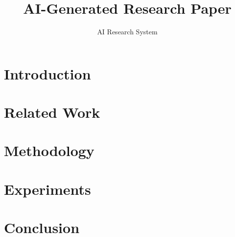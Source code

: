 \documentclass{article}
\title{AI-Generated Research Paper}
\author{AI Research System}
\begin{document}
\maketitle

\begin{abstract}

\end{abstract}

\section{Introduction}


\section{Related Work}


\section{Methodology}


\section{Experiments}


\section{Conclusion}




\end{document}
